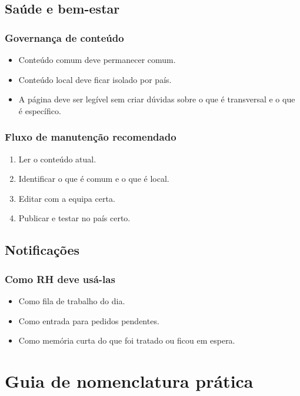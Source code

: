 \section{Saúde e bem-estar}
\subsection{Governança de conteúdo}
\begin{itemize}
  \item Conteúdo comum deve permanecer comum.
  \item Conteúdo local deve ficar isolado por país.
  \item A página deve ser legível sem criar dúvidas sobre o que é transversal e o que é específico.
\end{itemize}

\subsection{Fluxo de manutenção recomendado}
\begin{enumerate}
  \item Ler o conteúdo atual.
  \item Identificar o que é comum e o que é local.
  \item Editar com a equipa certa.
  \item Publicar e testar no país certo.
\end{enumerate}

\section{Notificações}
\subsection{Como RH deve usá-las}
\begin{itemize}
  \item Como fila de trabalho do dia.
  \item Como entrada para pedidos pendentes.
  \item Como memória curta do que foi tratado ou ficou em espera.
\end{itemize}

\chapter{Guia de nomenclatura prática}
